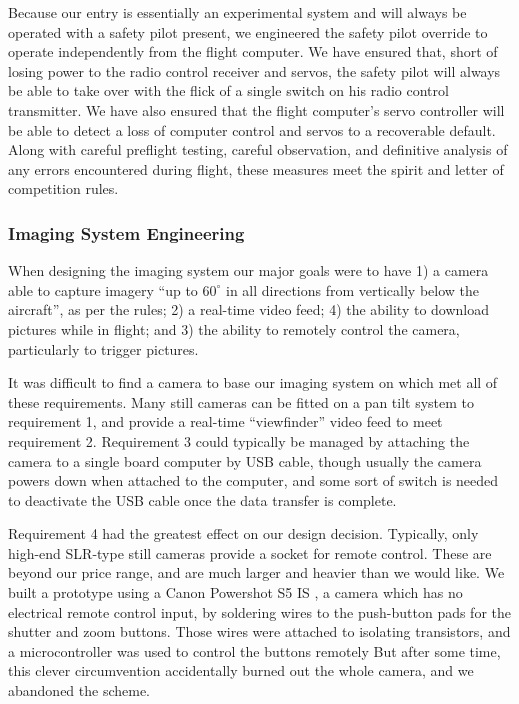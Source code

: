 \documentclass[10pt]{report}
\newcommand{\degrees}[1]
{
\begin{math}
#1^{\circ} 
\end{math}
}
\begin{document}
Because our entry is essentially an experimental system and will always be operated with a safety pilot present, we engineered the safety pilot override to operate independently from the flight computer. We have ensured that, short of losing power to the radio control receiver and servos, the safety pilot will always be able to take over with the flick of a single switch on his radio control transmitter. We have also ensured that the flight computer's servo controller will be able to detect a loss of computer control and servos to a recoverable default. Along with careful preflight testing, careful observation, and definitive analysis of any errors encountered during flight, these measures meet the spirit and letter of competition rules.

\subsubsection{Imaging System Engineering}

When designing the imaging system our major goals were to have 
1) a camera able to capture imagery ``up to \degrees{60} in all directions from vertically below the aircraft''\cite{competition_rules}, as per the rules; 
2) a real-time video feed;
4) the ability to download pictures while in flight; and
3) the ability to remotely control the camera, particularly to trigger pictures.

It was difficult to find a camera to base our imaging system on which met all of these requirements. Many still cameras can be fitted on a pan tilt system to requirement 1, and provide a real-time ``viewfinder'' video feed to meet requirement 2. Requirement 3 could typically be managed by attaching the camera to a single board computer by USB cable, though usually the camera powers down when attached to the computer, and some sort of switch is needed to deactivate the USB cable once the data transfer is complete.

Requirement 4 had the greatest effect on our design decision. Typically, only high-end SLR-type still cameras provide a socket for remote control. These are beyond our price range, and are much larger and heavier than we would like.
We built a prototype using a Canon Powershot S5 IS \cite{powershotS5}, a camera which has no electrical remote control input, by soldering wires to the push-button pads for the shutter and zoom buttons. Those wires were attached to isolating transistors, and a microcontroller was used to control the buttons remotely But after some time, this clever circumvention accidentally burned out the whole camera, and we abandoned the scheme.
\end{document}
